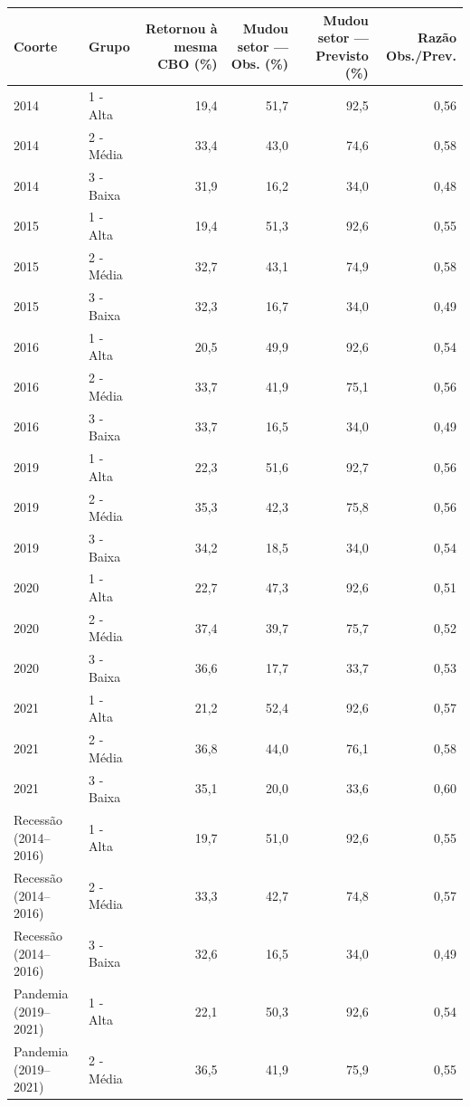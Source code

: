 \providecommand{\toprule}{\hline\hline}
\providecommand{\midrule}{\hline}
\providecommand{\bottomrule}{\hline\hline}
\providecommand{\addlinespace}[1][]{}
{\small
\renewcommand{\arraystretch}{1.12}
\begin{tabular}{llrrrr}
\toprule
Coorte & Grupo & Retornou à mesma CBO (\%) & Mudou setor — Obs. (\%) & Mudou setor — Previsto (\%) & Razão Obs./Prev. \\
\midrule
2014 & 1 - Alta & 19,4 & 51,7 & 92,5 & 0,56 \\
2014 & 2 - Média & 33,4 & 43,0 & 74,6 & 0,58 \\
2014 & 3 - Baixa & 31,9 & 16,2 & 34,0 & 0,48 \\
\addlinespace[3pt]
2015 & 1 - Alta & 19,4 & 51,3 & 92,6 & 0,55 \\
2015 & 2 - Média & 32,7 & 43,1 & 74,9 & 0,58 \\
2015 & 3 - Baixa & 32,3 & 16,7 & 34,0 & 0,49 \\
\addlinespace[3pt]
2016 & 1 - Alta & 20,5 & 49,9 & 92,6 & 0,54 \\
2016 & 2 - Média & 33,7 & 41,9 & 75,1 & 0,56 \\
2016 & 3 - Baixa & 33,7 & 16,5 & 34,0 & 0,49 \\
\addlinespace[3pt]
2019 & 1 - Alta & 22,3 & 51,6 & 92,7 & 0,56 \\
2019 & 2 - Média & 35,3 & 42,3 & 75,8 & 0,56 \\
2019 & 3 - Baixa & 34,2 & 18,5 & 34,0 & 0,54 \\
\addlinespace[3pt]
2020 & 1 - Alta & 22,7 & 47,3 & 92,6 & 0,51 \\
2020 & 2 - Média & 37,4 & 39,7 & 75,7 & 0,52 \\
2020 & 3 - Baixa & 36,6 & 17,7 & 33,7 & 0,53 \\
\addlinespace[3pt]
2021 & 1 - Alta & 21,2 & 52,4 & 92,6 & 0,57 \\
2021 & 2 - Média & 36,8 & 44,0 & 76,1 & 0,58 \\
2021 & 3 - Baixa & 35,1 & 20,0 & 33,6 & 0,60 \\
\addlinespace[3pt]
Recessão (2014–2016) & 1 - Alta & 19,7 & 51,0 & 92,6 & 0,55 \\
Recessão (2014–2016) & 2 - Média & 33,3 & 42,7 & 74,8 & 0,57 \\
Recessão (2014–2016) & 3 - Baixa & 32,6 & 16,5 & 34,0 & 0,49 \\
\addlinespace[3pt]
Pandemia (2019–2021) & 1 - Alta & 22,1 & 50,3 & 92,6 & 0,54 \\
Pandemia (2019–2021) & 2 - Média & 36,5 & 41,9 & 75,9 & 0,55 \\

\end{tabular}}
